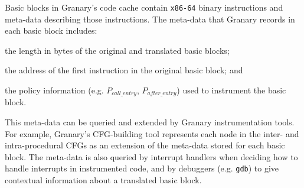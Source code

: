 \documentclass[preprint]{sigplanconf}
\begin{document}
Basic blocks in Granary's code cache contain \texttt{x86-64} binary instructions and meta-data describing those instructions. The meta-data that Granary records in each basic block includes: \begin{inparaenum}[i)]
	\item the length in bytes of the original and translated basic blocks;
	\item the address of the first instruction in the original basic block; and
	\item the policy information (e.g. $P_{call\_entry}$, $P_{after\_entry}$) used to instrument the basic block.
\end{inparaenum} This meta-data can be queried and extended by Granary instrumentation tools. For example, Granary's CFG-building tool represents each node in the inter- and intra-procedural CFGs as an extension of the meta-data stored for each basic block. The meta-data is also queried by interrupt handlers when deciding how to handle interrupts in instrumented code, and by debuggers (e.g. \texttt{gdb}) to give contextual information about a translated basic block. 






\end{document}
